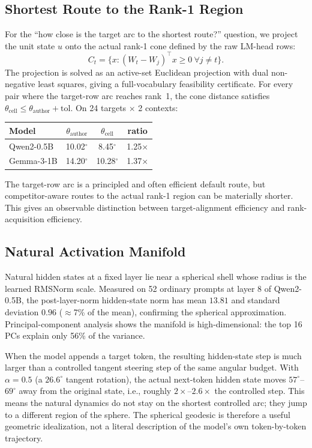 \documentclass{article}
\begin{document}
\subsection{Shortest Route to the Rank-1 Region}

For the ``how close is the target arc to the shortest route?'' question, we
project the unit state $u$ onto the actual rank-1 cone defined by the raw
LM-head rows:
\[
C_t = \{x : (W_t - W_j)^\top x \geq 0\ \forall j \neq t\}.
\]
The projection is solved as an active-set Euclidean projection with dual
non-negative least squares, giving a full-vocabulary feasibility certificate.
For every pair where the target-row arc reaches rank~1, the cone distance
satisfies $\theta_{\mathrm{cell}} \leq \theta_{\mathrm{author}} + \mathrm{tol}$.
On 24 targets $\times$ 2 contexts:

\begin{center}
\begin{tabular}{lccc}
\toprule
Model & $\theta_{\mathrm{author}}$ & $\theta_{\mathrm{cell}}$ & ratio \\
\midrule
Qwen2-0.5B & 10.02$^\circ$ & 8.45$^\circ$ & 1.25$\times$ \\
Gemma-3-1B & 14.20$^\circ$ & 10.28$^\circ$ & 1.37$\times$ \\
\bottomrule
\end{tabular}
\end{center}

The target-row arc is a principled and often efficient default route, but
competitor-aware routes to the actual rank-1 region can be materially shorter.
This gives an observable distinction between target-alignment efficiency and
rank-acquisition efficiency.

\subsection{Natural Activation Manifold}

Natural hidden states at a fixed layer lie near a spherical shell whose radius
is the learned RMSNorm scale. Measured on 52 ordinary prompts at layer 8 of
Qwen2-0.5B, the post-layer-norm hidden-state norm has mean $13.81$ and standard
deviation $0.96$ ($\approx$7\% of the mean), confirming the spherical
approximation. Principal-component analysis shows the manifold is
high-dimensional: the top 16 PCs explain only 56\% of the variance.

When the model appends a target token, the resulting hidden-state step is much
larger than a controlled tangent steering step of the same angular budget. With
$\alpha=0.5$ (a $26.6^\circ$ tangent rotation), the actual next-token hidden
state moves $57^\circ$--$69^\circ$ away from the original state, i.e., roughly
$2\times$--$2.6\times$ the controlled step. This means the natural dynamics do
not stay on the shortest controlled arc; they jump to a different region of the
sphere. The spherical geodesic is therefore a useful geometric idealization, not
a literal description of the model's own token-by-token trajectory.
\end{document}
